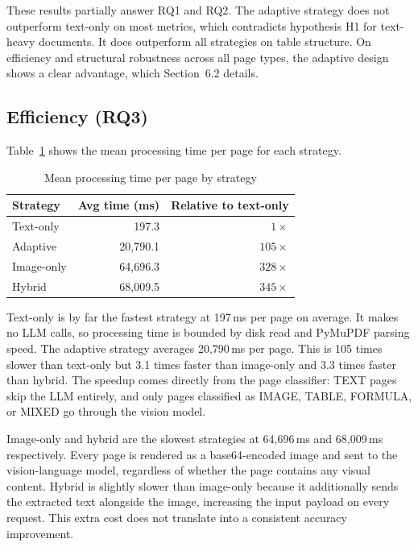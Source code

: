 \documentclass[12pt]{article}
\begin{document}
These results partially answer RQ1 and RQ2. The adaptive strategy does not
outperform text-only on most metrics, which contradicts hypothesis H1 for
text-heavy documents. It does outperform all strategies on table structure.
On efficiency and structural robustness across all page types, the adaptive
design shows a clear advantage, which Section~6.2 details.

\subsection{Efficiency (RQ3)}

Table~\ref{tab:efficiency} shows the mean processing time per page for
each strategy.

\begin{table}[h!]
\centering
\caption{Mean processing time per page by strategy}
\label{tab:efficiency}
\renewcommand{\arraystretch}{1.4}
\begin{tabular}{lrr}
\toprule
\textbf{Strategy} & \textbf{Avg time (ms)} & \textbf{Relative to text-only} \\
\midrule
Text-only  &    197.3 & $1\times$ \\
Adaptive   & 20{,}790.1 & $105\times$ \\
Image-only & 64{,}696.3 & $328\times$ \\
Hybrid     & 68{,}009.5 & $345\times$ \\
\bottomrule
\end{tabular}
\end{table}

Text-only is by far the fastest strategy at 197\,ms per page on average.
It makes no LLM calls, so processing time is bounded by disk read and
PyMuPDF parsing speed. The adaptive strategy averages 20{,}790\,ms per page.
This is 105 times slower than text-only but 3.1 times faster than
image-only and 3.3 times faster than hybrid. The speedup comes directly
from the page classifier: TEXT pages skip the LLM entirely, and only pages
classified as IMAGE, TABLE, FORMULA, or MIXED go through the vision model.

Image-only and hybrid are the slowest strategies at 64{,}696\,ms and
68{,}009\,ms respectively. Every page is rendered as a base64-encoded image
and sent to the vision-language model, regardless of whether the page
contains any visual content. Hybrid is slightly slower than image-only
because it additionally sends the extracted text alongside the image,
increasing the input payload on every request. This extra cost does not
translate into a consistent accuracy improvement.
\end{document}
